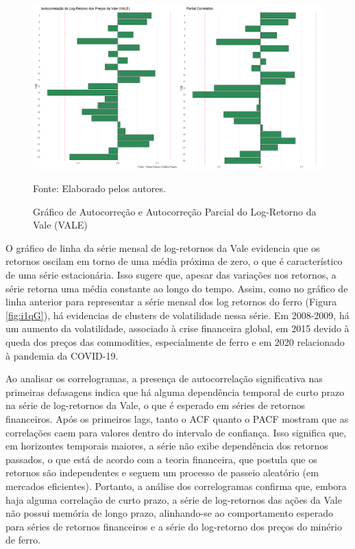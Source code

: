 \documentclass[a4paper,12pt]{article}[abntex2]
\begin{document}
\begin{figure}[H]
    \centering
    \caption{Gráfico de Autocorreção e Autocorreção Parcial do Log-Retorno da Vale (VALE)} 
    \includegraphics[width=1.0\textwidth]{APS 2/i2qH.png}
    \label{fig:i2qH}
    
    \footnotesize{Fonte: Elaborado pelos autores.}
    \end{figure}

O gráfico de linha da série mensal de log-retornos da Vale evidencia que os retornos oscilam em torno de uma média próxima de zero, o que é característico de uma série estacionária. Isso sugere que, apesar das variações nos retornos, a série retorna uma média constante ao longo do tempo. Assim, como no gráfico de linha anterior para representar a série mensal dos log retornos do ferro (Figura \ref{fig:i1qG}), há evidencias de clusters de volatilidade nessa série. Em 2008-2009, há um aumento da volatilidade, associado à crise financeira global, em 2015 devido à queda dos preços das commodities, especialmente de ferro e em 2020 relacionado à pandemia da COVID-19.

Ao analisar os correlogramas, a presença de autocorrelação significativa nas primeiras defasagens indica que há alguma dependência temporal de curto prazo na série de log-retornos da Vale, o que é esperado em séries de retornos financeiros. Após os primeiros lags, tanto o ACF quanto o PACF mostram que as correlações caem para valores dentro do intervalo de confiança. Isso significa que, em horizontes temporais maiores, a série não exibe dependência dos retornos passados, o que está de acordo com a teoria financeira, que postula que os retornos são independentes e seguem um processo de passeio aleatório (em mercados eficientes). Portanto, a análise dos correlogramas confirma que, embora haja alguma correlação de curto prazo, a série de log-retornos das ações da Vale não possui memória de longo prazo, alinhando-se ao comportamento esperado para séries de retornos financeiros e a série do log-retorno dos preços do minério de ferro.
\end{document}
